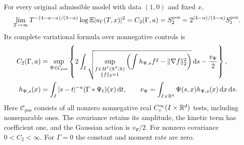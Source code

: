 \begin{theorem}
  \label{T:intrinsic-second-moment}
  For every original admissible model with data $(1,0)$ and fixed $x$,
  \begin{equation}\label{E:intrinsic-second-moment-limit}
    \lim_{T\to\infty}T^{-(4-\alpha-a)/(3-\alpha)}
    \log\mathbb{E}|u_\Gamma(T,x)|^2
    =C_2(\Gamma,a)=S_2^{\mathrm{pos}}
    =2^{(4-\alpha)/(3-\alpha)}S_1^{\mathrm{pos}}.
  \end{equation}
  Its complete variational formula over nonnegative controls is
  \begin{align}
    C_2(\Gamma,a)
    &=\sup_{\Psi\in\mathcal{C}_{\mathrm{pos}}}
    \left\{2\int_I
    \sqrt{\sup_{\substack{f\in H^1(\mathbb{R}^d;\mathbb{R})\\\|f\|_2=1}}
    \left(\int h_{\Psi,s}f^2-\|\nabla f\|_2^2\right)}
    \,\mathrm{d} s-\frac{v_\Psi}{2}\right\},
    \label{E:intrinsic-positive-formula}\\
    h_{\Psi,s}(x)
    &=\int_I|s-t|^{-a}(\Gamma*\Psi_t)(x)\,\mathrm{d} t,\qquad
    v_\Psi=\int_{I\times\mathbb{R}^d}\Psi(s,x)h_{\Psi,s}(x)\,\mathrm{d} x\,\mathrm{d} s.
    \notag
  \end{align}
  Here $\mathcal{C}_{\mathrm{pos}}$ consists of all nonzero nonnegative real
  $C_c^\infty(I\times\mathbb{R}^d)$ tests, including nonseparable ones. The covariance
  retains its amplitude, the kinetic term has coefficient one, and the Gaussian
  action is $v_\Psi/2$. For nonzero covariance $0 < C_2 < \infty$. For $\Gamma =
  0$ the constant and moment rate are zero.
\end{theorem}

